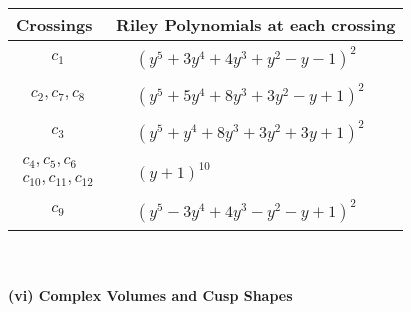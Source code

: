 \documentclass[1p]{elsarticle_modified}
\theoremstyle{definition}
\begin{document}
\begin{tabular}{m{50pt}|m{274pt}}
Crossings & \hspace{64pt}Riley Polynomials at each crossing \\
\hline $$\begin{aligned}c_{1}\end{aligned}$$&$\begin{aligned}
&(y^5+3 y^4+4 y^3+y^2- y-1)^2
\end{aligned}$\\
\hline $$\begin{aligned}c_{2},c_{7},c_{8}\end{aligned}$$&$\begin{aligned}
&(y^5+5 y^4+8 y^3+3 y^2- y+1)^2
\end{aligned}$\\
\hline $$\begin{aligned}c_{3}\end{aligned}$$&$\begin{aligned}
&(y^5+y^4+8 y^3+3 y^2+3 y+1)^2
\end{aligned}$\\
\hline $$\begin{aligned}c_{4},c_{5},c_{6}\\c_{10},c_{11},c_{12}\end{aligned}$$&$\begin{aligned}
&(y+1)^{10}
\end{aligned}$\\
\hline $$\begin{aligned}c_{9}\end{aligned}$$&$\begin{aligned}
&(y^5-3 y^4+4 y^3- y^2- y+1)^2
\end{aligned}$\\
\hline
\end{tabular}\\~\\
\newpage\flushleft \textbf{(vi) Complex Volumes and Cusp Shapes}
\end{document}
